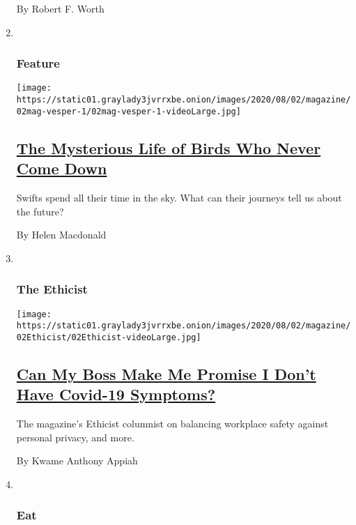 \begin{enumerate}
  By Robert F. Worth
\item ~
  \hypertarget{feature-3}{%
  \subsubsection{Feature}\label{feature-3}}

  \texttt{[image: https://static01.graylady3jvrrxbe.onion/images/2020/08/02/magazine/02mag-vesper-1/02mag-vesper-1-videoLarge.jpg]}

  \hypertarget{the-mysterious-life-of-birds-who-never-come-down}{%
  \subsection{\texorpdfstring{\href{/2020/07/29/magazine/vesper-flights.html}{The
  Mysterious Life of Birds Who Never Come
  Down}}{The Mysterious Life of Birds Who Never Come Down}}\label{the-mysterious-life-of-birds-who-never-come-down}}

  Swifts spend all their time in the sky. What can their journeys tell
  us about the future?

  By Helen Macdonald
\item ~
  \hypertarget{the-ethicist-1}{%
  \subsubsection{The Ethicist}\label{the-ethicist-1}}

  \texttt{[image: https://static01.graylady3jvrrxbe.onion/images/2020/08/02/magazine/02Ethicist/02Ethicist-videoLarge.jpg]}

  \hypertarget{can-my-boss-make-me-promise-i-dont-have-covid-19-symptoms}{%
  \subsection{\texorpdfstring{\href{/2020/07/28/magazine/can-my-boss-make-me-promise-i-dont-have-covid-19-symptoms.html}{Can
  My Boss Make Me Promise I Don't Have Covid-19
  Symptoms?}}{Can My Boss Make Me Promise I Don't Have Covid-19 Symptoms?}}\label{can-my-boss-make-me-promise-i-dont-have-covid-19-symptoms}}

  The magazine's Ethicist columnist on balancing workplace safety
  against personal privacy, and more.

  By Kwame Anthony Appiah
\item ~
  \hypertarget{eat}{%
  \subsubsection{Eat}\label{eat}}


\end{enumerate}
